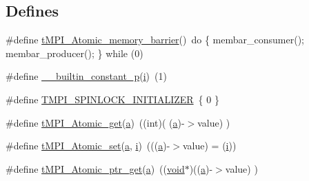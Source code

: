 \subsection*{\-Defines}
\begin{DoxyCompactItemize}
\item 
\#define \hyperlink{share_2template_2gromacs_2thread__mpi_2atomic_2suncc-sparc_8h_a5d2ee17509e3123d1c71d00b02888daa}{t\-M\-P\-I\-\_\-\-Atomic\-\_\-memory\-\_\-barrier}()~do \{ membar\-\_\-consumer(); membar\-\_\-producer(); \} while (0)
\item 
\#define \hyperlink{share_2template_2gromacs_2thread__mpi_2atomic_2suncc-sparc_8h_a7c293860c23f189cdcc22c9d3e5e5aff}{\-\_\-\-\_\-builtin\-\_\-constant\-\_\-p}(\hyperlink{share_2template_2gromacs_2gmx__lapack_8h_a3c7542401c1cb8bd37ef5e7d9eb0f5a8}{i})~(1)
\item 
\#define \hyperlink{share_2template_2gromacs_2thread__mpi_2atomic_2suncc-sparc_8h_a1e5bbd6483e8792893f3a5e8e2bbe510}{\-T\-M\-P\-I\-\_\-\-S\-P\-I\-N\-L\-O\-C\-K\-\_\-\-I\-N\-I\-T\-I\-A\-L\-I\-Z\-E\-R}~\{ 0 \}
\item 
\#define \hyperlink{share_2template_2gromacs_2thread__mpi_2atomic_2suncc-sparc_8h_ad046655ee56cc30c2a8719f3d1091b8e}{t\-M\-P\-I\-\_\-\-Atomic\-\_\-get}(\hyperlink{share_2template_2gromacs_2gmx__lapack_8h_a0880879736d1ab747a972d1942421886}{a})~((int)( (\hyperlink{share_2template_2gromacs_2gmx__lapack_8h_a0880879736d1ab747a972d1942421886}{a})-\/$>$value) )
\item 
\#define \hyperlink{share_2template_2gromacs_2thread__mpi_2atomic_2suncc-sparc_8h_a3e989e8b5935d25fdc5cde21b153482c}{t\-M\-P\-I\-\_\-\-Atomic\-\_\-set}(\hyperlink{share_2template_2gromacs_2gmx__lapack_8h_a0880879736d1ab747a972d1942421886}{a}, \hyperlink{share_2template_2gromacs_2gmx__lapack_8h_a3c7542401c1cb8bd37ef5e7d9eb0f5a8}{i})~(((\hyperlink{share_2template_2gromacs_2gmx__lapack_8h_a0880879736d1ab747a972d1942421886}{a})-\/$>$value) = (\hyperlink{share_2template_2gromacs_2gmx__lapack_8h_a3c7542401c1cb8bd37ef5e7d9eb0f5a8}{i}))
\item 
\#define \hyperlink{share_2template_2gromacs_2thread__mpi_2atomic_2suncc-sparc_8h_a0769c59b89bb5ff489110f9de52658cf}{t\-M\-P\-I\-\_\-\-Atomic\-\_\-ptr\-\_\-get}(\hyperlink{share_2template_2gromacs_2gmx__lapack_8h_a0880879736d1ab747a972d1942421886}{a})~((\hyperlink{nbnxn__kernel__simd__4xn__outer_8h_a8dc3f4a797ed992dff49d2fa3477eee8}{void}$\ast$)((\hyperlink{share_2template_2gromacs_2gmx__lapack_8h_a0880879736d1ab747a972d1942421886}{a})-\/$>$value) )
\item 

\end{DoxyCompactItemize}
